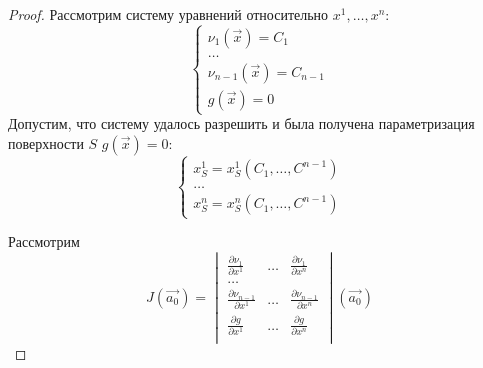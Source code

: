\documentclass[a4paper, 12pt]{article}
\begin{document}
\begin{proof}
        Рассмотрим систему уравнений относительно $x^1, \dots, x^n$:
        \begin{equation}
            \begin{cases}
                \nu_1 \left( \overrightarrow{x} \right) = C_1             \\
                \dots                                                     \\
                \nu_{n - 1} \left( \overrightarrow{x} \right) = C_{n - 1} \\
                g \left( \overrightarrow{x} \right) = 0
            \end{cases}
            \label{part_eq_5}
        \end{equation}
        Допустим, что систему удалось разрешить и была получена параметризация поверхности $S$ $g \left( \overrightarrow{x} \right) = 0$:
        \begin{equation*}
            \begin{cases}
                x^1_S = x^1_S \left( C_1, \dots, C^{n - 1} \right) \\
                \dots                                              \\
                x^n_S = x^n_S \left( C_1, \dots, C^{n - 1} \right)
            \end{cases}
        \end{equation*}

        Рассмотрим
        \begin{equation*}
            J \left( \overrightarrow{a_0} \right) =
            \begin{vmatrix}
                \frac{\partial \nu_1}{\partial x^1} & \dots & \frac{\partial \nu_1}{\partial x^n}             \\
                \dots                                                                                         \\
                \frac{\partial \nu_{n - 1}}{\partial x^1} & \dots & \frac{\partial \nu_{n - 1}}{\partial x^n} \\
                \frac{\partial g}{\partial x^1} & \dots & \frac{\partial g}{\partial x^n}                     \\
            \end{vmatrix}  \left( \overrightarrow{a_0} \right)
        \end{equation*}


\end{proof}
\end{document}
